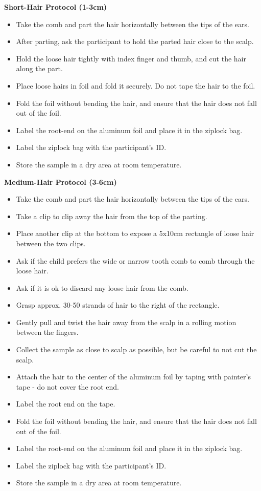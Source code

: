 \documentclass[]{book}
\providecommand{\tightlist}{%
  \setlength{\itemsep}{0pt}\setlength{\parskip}{0pt}}
\begin{document}
\textbf{Short-Hair Protocol (1-3cm)}

\begin{itemize}
\tightlist
\item
  Take the comb and part the hair horizontally between the tips of the ears.
\item
  After parting, ask the participant to hold the parted hair close to the scalp.
\item
  Hold the loose hair tightly with index finger and thumb, and cut the hair along the part.
\item
  Place loose hairs in foil and fold it securely. Do not tape the hair to the foil.
\item
  Fold the foil without bending the hair, and ensure that the hair does not fall out of the foil.
\item
  Label the root-end on the aluminum foil and place it in the ziplock bag.
\item
  Label the ziplock bag with the participant's ID.
\item
  Store the sample in a dry area at room temperature.
\end{itemize}

\textbf{Medium-Hair Protocol (3-6cm)}

\begin{itemize}
\tightlist
\item
  Take the comb and part the hair horizontally between the tips of the ears.
\item
  Take a clip to clip away the hair from the top of the parting.
\item
  Place another clip at the bottom to expose a 5x10cm rectangle of loose hair between the two clips.
\item
  Ask if the child prefers the wide or narrow tooth comb to comb through the loose hair.
\item
  Ask if it is ok to discard any loose hair from the comb.
\item
  Grasp approx. 30-50 strands of hair to the right of the rectangle.
\item
  Gently pull and twist the hair away from the scalp in a rolling motion between the fingers.
\item
  Collect the sample as close to scalp as possible, but be careful to not cut the scalp.
\item
  Attach the hair to the center of the aluminum foil by taping with painter's tape - do not cover the root end.
\item
  Label the root end on the tape.
\item
  Fold the foil without bending the hair, and ensure that the hair does not fall out of the foil.
\item
  Label the root-end on the aluminum foil and place it in the ziplock bag.
\item
  Label the ziplock bag with the participant's ID.
\item
  Store the sample in a dry area at room temperature.
\end{itemize}
\end{document}
